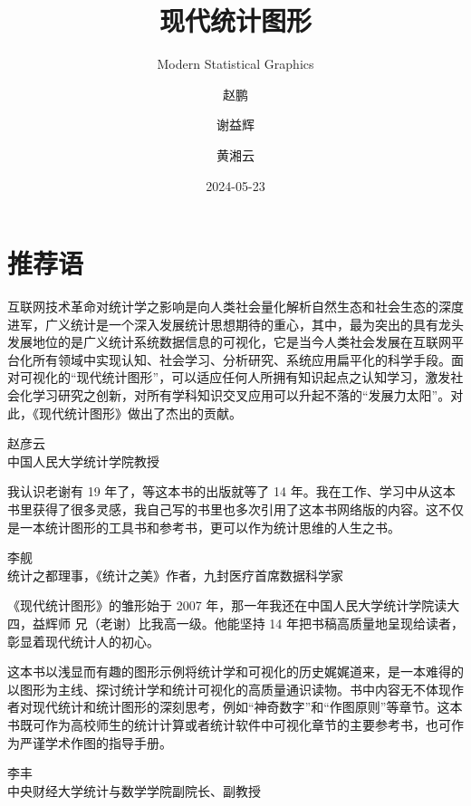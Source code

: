 \documentclass[
  b5paper,
  UTF8,twoside]{book}
\title{现代统计图形}
\subtitle{Modern Statistical Graphics}
\author{赵鹏 \and 谢益辉 \and 黄湘云}
\date{2024-05-23}
\begin{document}
\maketitle

{
\hypersetup{linkcolor=}
\setcounter{tocdepth}{1}
\tableofcontents
}
\listoffigures
\listoftables
\chapter*{推荐语}\label{welcome}

互联网技术革命对统计学之影响是向人类社会量化解析自然生态和社会生态的深度进军，广义统计是一个深入发展统计思想期待的重心，其中，最为突出的具有龙头发展地位的是广义统计系统数据信息的可视化，它是当今人类社会发展在互联网平台化所有领域中实现认知、社会学习、分析研究、系统应用扁平化的科学手段。面对可视化的``现代统计图形''，可以适应任何人所拥有知识起点之认知学习，激发社会化学习研究之创新，对所有学科知识交叉应用可以升起不落的``发展力太阳''。对此，《现代统计图形》做出了杰出的贡献。

\begin{flushright}
赵彦云\\
中国人民大学统计学院教授
\end{flushright}

我认识老谢有 19 年了，等这本书的出版就等了 14 年。我在工作、学习中从这本书里获得了很多灵感，我自己写的书里也多次引用了这本书网络版的内容。这不仅是一本统计图形的工具书和参考书，更可以作为统计思维的人生之书。

\begin{flushright}
李舰\\
统计之都理事，《统计之美》作者，九封医疗首席数据科学家
\end{flushright}

《现代统计图形》的雏形始于 2007 年，那一年我还在中国人民大学统计学院读大四，益辉师
兄（老谢）比我高一级。他能坚持 14 年把书稿高质量地呈现给读者，彰显着现代统计人的初心。

这本书以浅显而有趣的图形示例将统计学和可视化的历史娓娓道来，是一本难得的以图形为主线、探讨统计学和统计可视化的高质量通识读物。书中内容无不体现作者对现代统计和统计图形的深刻思考，例如``神奇数字''和``作图原则''等章节。这本书既可作为高校师生的统计计算或者统计软件中可视化章节的主要参考书，也可作为严谨学术作图的指导手册。

\begin{flushright}
李丰\\
中央财经大学统计与数学学院副院长、副教授
\end{flushright}
\end{document}
